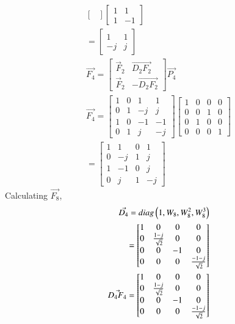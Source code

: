 \documentclass[journal,12pt,twocolumn]{IEEEtran}
\renewcommand\thesection{\arabic{section}}
\begin{document}
\begin{enumerate}[label=\thesection.\arabic*]
\begin{enumerate}[label=\arabic*.,ref=\thesection.\theenumi]
\begin{align}
\begin{bmatrix}
       \end{bmatrix}\begin{bmatrix}
         1&1\\1&-1
       \end{bmatrix}\\
       =\begin{bmatrix}
         1&1\\-j&j
       \end{bmatrix}\\
       \vec{F_4}=\begin{bmatrix}
         \vec{F}_{2} & \vec{D_2F_2} \\
         \vec{F}_{2} & -\vec{D_2F_2}
       \end{bmatrix}\vec{P_4}\\
       \vec{F_4}=\begin{bmatrix}
         1&0&1&1\\0&1&-j&j\\1&0&-1&-1\\0&1&j&-j
       \end{bmatrix}\begin{bmatrix}
         1&0&0&0\\0&0&1&0\\0&1&0&0\\0&0&0&1
       \end{bmatrix}\\
       =\begin{bmatrix}
         1&1&0&1\\0&-j&1&j\\1&-1&0&j\\0&j&1&-j
       \end{bmatrix}
     \end{align}
     Calculating $\vec{F_8}$,
     \begin{align}
       \vec{D_4}=diag\left(1,W_8,W_8^2,W_8^3\right)\\
       =\begin{bmatrix}
         1&0&0&0\\0&\frac{1-j}{\sqrt{2}}&0&0\\0&0&-1&0\\0&0&0&\frac{-1-j}{\sqrt{2}}
       \end{bmatrix}\\
       \vec{D_4F_4}=\begin{bmatrix}
         1&0&0&0\\0&\frac{1-j}{\sqrt{2}}&0&0\\0&0&-1&0\\0&0&0&\frac{-1-j}{\sqrt{2}}

\end{bmatrix}
\end{align}
\end{enumerate}
\end{enumerate}
\end{document}
